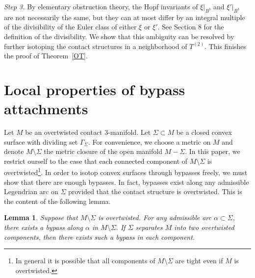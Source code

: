 \documentclass[12pt]{amsart}
\newtheorem{lemma}[thm]{Lemma}
\theoremstyle{remark}
\begin{document}
\noindent\textit{Step 3.} By elementary obstruction theory, the Hopf invariants of $\xi|_{B^3}$ and $\xi'|_{B^3}$ are not necessarily the same, but they can at most differ by an integral multiple of the divisibility of the Euler class of either $\xi$ or $\xi'$. See Section 8 for the definition of the divisibility. We show that this ambiguity can be resolved by further isotoping the contact structures in a neighborhood of $T^{(2)}$. This finishes the proof of Theorem~\ref{OT}.

\section{Local properties of bypass attachments}

Let $M$ be an overtwisted contact 3-manifold. Let $\Sigma \subset M$ be a closed convex surface with dividing set $\Gamma_\Sigma$. For convenience, we choose a metric on $M$ and denote $M\setminus\Sigma$ the metric closure of the open manifold $M-\Sigma$. In this paper, we restrict ourself to the case that each connected component of $M \setminus \Sigma$ is overtwisted\footnote{In general it is possible that all components of $M \setminus \Sigma$ are tight even if $M$ is overtwisted.}. In order to isotop convex surfaces through bypasses freely, we must show that there are enough bypasses. In fact, bypasses exist along any admissible Legendrian arc on $\Sigma$ provided that the contact structure is overtwisted. This is the content of the following lemma.

\begin{lemma} \label{Abund}
Suppose that $M\setminus\Sigma$ is overtwisted. For any admissible arc $\alpha\subset\Sigma$, there exists a bypass along $\alpha$ in $M\setminus\Sigma$. If $\Sigma$ separates $M$ into two overtwisted components, then there exists such a bypass in each component.
\end{lemma}
\end{document}
